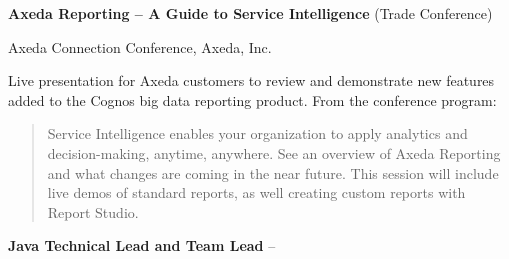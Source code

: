 \documentclass[letterpaper,MMMMyyyy,nonstopmode]{simpleresumecv}
\begin{document}
\begin{Body}
\iffalse      %
\Entry
\textbf{Adjunct Lecturer}
\hfill
Fall 2017

Rochester Institute of Technology
\begin{Detail}
\Item
Lecturer for a class of 30 undergraduate and graduate students for the course ISTE-120, an introduction to Java course for Information Science and Technology majors.
\end{Detail}

\BigGap
\Entry
\textbf{Summer Co-Op Mentor}
\hfill
Summer 2015

Paychex, Inc.
\begin{Detail}
\Item
After interviewing a number of students, our team brought on a college student for three months. During that time I mentored them on their development tasks, our software development life cycle, version control, and working on a real-world development team. During this time I had the opportunity to give feedback on code, show how things learned in the classroom apply to corporate development, and work through actual software engineering problems.
\end{Detail}
\fi      %

\BigGap
\Entry
\textbf{Axeda Reporting -- A Guide to Service Intelligence} (Trade Conference)
\hfill
{}

Axeda Connection Conference, Axeda, Inc.
\begin{Detail}
\Item
Live presentation for Axeda customers to review and demonstrate new features added to the Cognos big data reporting product.
\ifB
\Item
From the conference program:
\begin{quote}
Service Intelligence enables your organization to apply analytics and decision-making, anytime, anywhere. See an overview of Axeda Reporting and what changes are coming in the near future. This session will include live demos of standard reports, as well creating custom reports with Report Studio.
\end{quote}
\fi
\end{Detail}

\ifC      %
\BigGap
\Entry
\textbf{Java Technical Lead and Team Lead}
\hfill
{} -- 


\end{Body}
\end{document}
